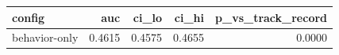 \begin{tabular}{lrrrr}
\toprule
config & auc & ci\_lo & ci\_hi & p\_vs\_track\_record \\
\midrule
behavior-only & 0.4615 & 0.4575 & 0.4655 & 0.0000 \\
\bottomrule
\end{tabular}
